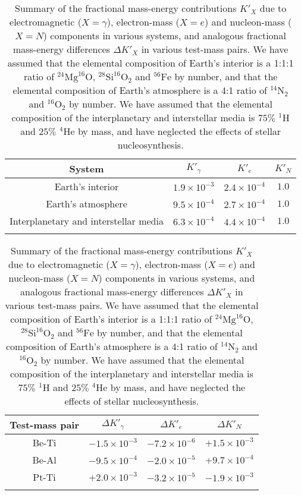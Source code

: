 \documentclass[aps,prd,onecolumn,nofootinbib]{revtex4-2} %
\begin{document}
\begin{table}[t!]
\centering
\caption{\normalsize  
Summary of the fractional mass-energy contributions $K'_X$ due to electromagnetic ($X = \gamma$), electron-mass ($X = e$) and nucleon-mass ($X = N$) components in various systems, and analogous fractional mass-energy differences $\Delta K'_X$ in various test-mass pairs. 
We have assumed that the elemental composition of Earth's interior is a 1:1:1 ratio of $^{24}\textrm{Mg}^{16}\textrm{O}$, $^{28}\textrm{Si}^{16}\textrm{O}_2$ and $^{56}\textrm{Fe}$ by number, and that the elemental composition of Earth's atmosphere is a 4:1 ratio of $^{14}\textrm{N}_2$ and $^{16}\textrm{O}_2$ by number. 
We have assumed that the elemental composition of the interplanetary and interstellar media is $75\%$ $^{1}$H and $25\%$ $^{4}$He by mass, and have neglected the effects of stellar nucleosynthesis. 
}
\label{tab:frac_mass-energies}
\vspace{5mm}
\large
\begin{tabular}{ |c|c|c|c| }%
\hline
 System & $K'_\gamma$ & $K'_e$ & $K'_N$  \\ \hline 
 Earth's interior & $1.9 \times 10^{-3}$ & $2.4 \times 10^{-4}$ & $1.0$  \\ \hline 
 Earth's atmosphere & $9.5 \times 10^{-4}$ & $2.7 \times 10^{-4}$ & $1.0$  \\ \hline 
 Interplanetary and interstellar media & $6.3 \times 10^{-4}$ & $4.4 \times 10^{-4}$ & $1.0$  \\ \hline 
\multicolumn{1}{c}{} & \multicolumn{1}{c}{} & \multicolumn{1}{c}{} & \multicolumn{1}{c}{}  \\ 
\end{tabular}
\begin{tabular}{ |c|c|c|c| }%
\hline
 Test-mass pair & $\Delta K'_\gamma$ & $\Delta K'_e$ & $\Delta K'_N$  \\ \hline 
 Be-Ti & $-1.5 \times 10^{-3}$ & $-7.2 \times 10^{-6}$ & $+1.5 \times 10^{-3}$  \\ \hline 
 Be-Al & $-9.5 \times 10^{-4}$ & $-2.0 \times 10^{-5}$ & $+9.7 \times 10^{-4}$  \\ \hline 
 Pt-Ti & $+2.0 \times 10^{-3}$ & $-3.2 \times 10^{-5}$ & $-1.9 \times 10^{-3}$  \\ \hline 
\multicolumn{1}{c}{} & \multicolumn{1}{c}{} & \multicolumn{1}{c}{} & \multicolumn{1}{c}{}  \\ 
\end{tabular}
\end{table}
\end{document}
